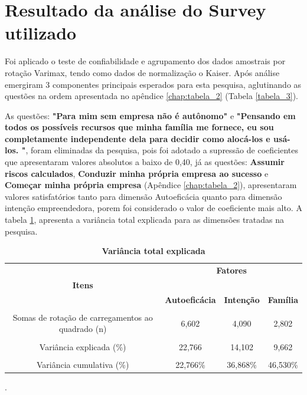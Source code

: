 \section{Resultado da análise do Survey utilizado}

Foi aplicado o teste de confiabilidade e agrupamento dos dados amostrais por rotação Varimax, tendo como dados de normalização o Kaiser\footnotemark[1]. 
Após análise  emergiram 3 componentes principais esperados para esta pesquisa, aglutinando as questões na ordem apresentada no apêndice \ref{chap:tabela_2} (Tabela \ref{tabela_3}).


As questões: \textbf{"Para mim sem empresa não é autônomo"} e \textbf{"Pensando em todos os possíveis recursos que minha família me fornece, eu sou completamente independente dela para decidir como alocá-los e usá-los.			
"}, foram eliminadas da pesquisa, pois foi adotado a supressão de coeficientes que apresentaram valores absolutos a baixo de 0,40, já as questões: \textbf{Assumir riscos calculados}, \textbf{Conduzir minha própria empresa ao sucesso} e \textbf{Começar minha própria empresa} (Apêndice \ref{chap:tabela_2}), apresentaram valores satisfatórios tanto para dimensão Autoeficácia quanto para dimensão intenção empreendedora, porem foi considerado o valor de coeficiente mais alto. 
A tabela \ref{tab:tabela_4}, apresenta a variância total explicada para as dimensões tratadas na pesquisa. 


\begin{table}[H]
 \centering
\caption{\textbf{Variância total explicada}}
\label{tab:tabela_4}
\hline\hline
\begin{tabular}{c c c c }
\multicolumn{1}{p{6cm}}{} & \multicolumn{3}{c}{\textbf{Fatores}}\\ 
 \multicolumn{1}{c}{\textbf{Itens}} & \multicolumn{3}{c}{\hrulefill}\\ 

 \multicolumn{1}{c}{} 
 &\multicolumn{1}{c}{\textbf{Autoeficácia}} & \multicolumn{1}{c}{\textbf{Intenção}} &\multicolumn{1}{c}{\textbf{Família}}  
\\\\ \hline 

 Somas de rotação de carregamentos ao quadrado (n)
 & 6,602 & 4,090 & 2,802 \\\\
 Variância explicada (\%)
 & 22,766 & 14,102 & 9,662\\\\
 Variância cumulativa (\%)
 & 22,766\% & 36,868\% & 46,530\% \\\hline \hline 
\end{tabular}
.
\end{table}


